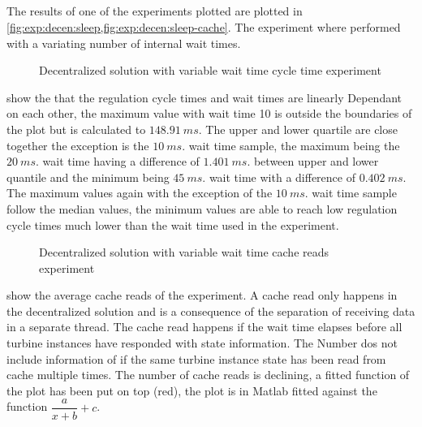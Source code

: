 \subsection{}

The results of one of the  experiments plotted are plotted in \cref{fig:exp:decen:sleep,fig:exp:decen:sleep-cache}.
The experiment where performed with a variating number of internal wait times.

\begin{figure}[h]
	\centering
	
	\caption{Decentralized solution with variable wait time cycle time experiment}
	\label{fig:exp:decen:sleep}
\end{figure}

 show the that the regulation cycle times and wait times are linearly Dependant on each other, the maximum value with wait time 10 is outside the boundaries of the plot but is calculated to $148.91~ms.$ The upper and lower quartile are close together the exception is the $10~ms.$ wait time sample, the maximum being the $20~ms.$ wait time having a difference of $1.401~ms.$ between upper and lower quantile and the minimum being $45~ms.$ wait time with a difference of $0.402~ms.$ The maximum values again with the exception of the $10~ms.$ wait time sample follow the median values, the minimum values are able to reach low regulation cycle times much lower than the wait time used in the experiment.

\begin{figure}[h]
	\centering
	
	\caption{Decentralized solution with variable wait time cache reads experiment}
	\label{fig:exp:decen:sleep-cache}
\end{figure}

 show the average cache reads of the experiment.
A cache read only happens in the decentralized solution and is a consequence of the separation of receiving data in a separate thread.
The cache read happens if the wait time elapses before all turbine instances have responded with state information. The Number dos not include information of if the same turbine instance state has been read from cache multiple times.
The number of cache reads is declining, a fitted function of the plot has been put on top (red), the plot is in Matlab fitted against the function $\dfrac{a}{x + b} + c$.

